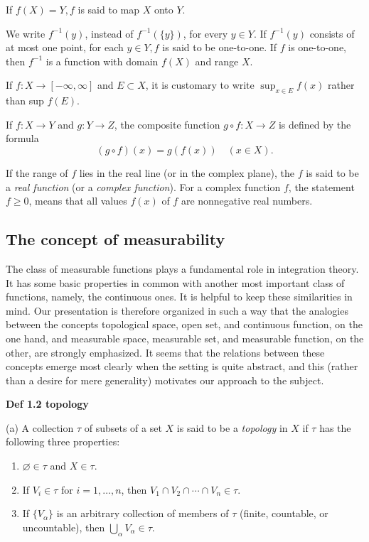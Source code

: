 \documentclass[11pt]{article}
\begin{document}
If \(f(X)=Y, f\) is said to map \(X\) onto \(Y\).

We write \(f^{-1}(y)\), instead of \(f^{-1}(\{y\})\), for every \(y \in Y\). If \(f^{-1}(y)\) consists of at most one point, for each \(y \in Y, f\) is said to be one-to-one. If \(f\) is one-to-one, then \(f^{-1}\) is a function with domain \(f(X)\) and range \(X\).

If \(f: X \rightarrow[-\infty, \infty]\) and \(E \subset X\), it is customary to write \(\sup _{x \in E} f(x)\) rather than sup \(f(E)\).

If \(f: X \rightarrow Y\) and \(g: Y \rightarrow Z\), the composite function \(g \circ f: X \rightarrow Z\) is defined by the formula
\[(g \circ f) (x) = g(f(x))\quad (x \in X).\]

If the range of \(f\) lies in the real line (or in the complex plane), the \(f\) is said to be a \emph{real function} (or a \emph{complex function}). For a complex function \(f\), the statement \(f \ge 0\), means that all values \(f(x)\) of \(f\) are nonnegative real numbers.
\subsection{The concept of measurability}
\label{sec:org909ed56}

The class of measurable functions plays a fundamental role in integration theory. It has some basic properties in common with another most important class of functions, namely, the continuous ones. It is helpful to keep these similarities in mind. Our presentation is therefore organized in such a way that the analogies between the concepts topological space, open set, and continuous function, on the one hand, and measurable space, measurable set, and measurable function, on the other, are strongly emphasized. It seems that the relations between these concepts emerge most clearly when the setting is quite abstract, and this (rather than a desire for mere generality) motivates our approach to the subject.

\medskip
\label{org06e8263} \textbf{Def 1.2 topology}

(a) A collection \(\tau\) of subsets of a set \(X\) is said to be a \emph{topology} in \(X\) if \(\tau\) has the following three properties:

\begin{enumerate}
\item \(\varnothing \in \tau\) and \(X \in \tau\).
\item If \(V_i \in \tau\) for \(i = 1, \ldots, n\), then \(V_1 \cap V_2 \cap \cdots \cap V_n \in \tau\).
\item If \(\{V_\alpha\}\) is an arbitrary collection of members of \(\tau\) (finite, countable, or uncountable), then \(\bigcup_\alpha V_\alpha \in \tau\).
\end{enumerate}
\end{document}
